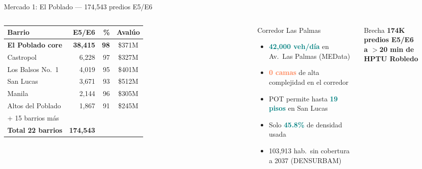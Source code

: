 \documentclass[aspectratio=169, 11pt]{beamer}
\newcommand{\highlight}[1]{\textcolor{teal}{\textbf{#1}}}
\newcommand{\danger}[1]{\textcolor{coral}{\textbf{#1}}}
\newcommand{\src}[1]{\par\vspace{2pt}{\tiny\textcolor{slate}{Fuente: #1}}}
\begin{document}
\begin{frame}{Mercado 1: El Poblado --- 174,543 predios E5/E6}

\begin{columns}[T]
{\scriptsize\setlength{\tabcolsep}{3pt}
\begin{tabular}{@{}lrrc@{}}
\toprule
\textbf{Barrio} & \textbf{E5/E6} & \textbf{\%} & \textbf{Avalúo} \\
\midrule
\rowcolor{teal!8}
\textbf{El Poblado core} & \textbf{38,415} & \textbf{98} & \$371M \\
Castropol & 6,228 & 97 & \$327M \\
Los Balsos No.\ 1 & 4,019 & 95 & \$401M \\
San Lucas & 3,671 & 93 & \$512M \\
Manila & 2,144 & 96 & \$305M \\
\rowcolor{teal!6}
Altos del Poblado & 1,867 & 91 & \$245M \\
{\tiny + 15 barrios más} & & & \\
\midrule
\textbf{Total 22 barrios} & \textbf{174,543} & & \\
\bottomrule
\end{tabular}
}

\vspace{4pt}
\src{Catastro Medellín (bp59-rj8r)}

\begin{exampleblock}{\small Corredor Las Palmas}
\footnotesize
\begin{itemize}\setlength{\itemsep}{2pt}
  \item \highlight{42,000 veh/día} en Av.\ Las Palmas (MEData)
  \item \danger{0 camas} de alta complejidad en el corredor
  \item POT permite hasta \highlight{19 pisos} en San Lucas
  \item Solo \highlight{45.8\%} de densidad usada
  \item 103,913 hab.\ sin cobertura a 2037 (DENSURBAM)
\end{itemize}
\end{exampleblock}

\vspace{4pt}
\begin{alertblock}{\small Brecha}
\centering\footnotesize
\textbf{174K predios E5/E6\\a $>$20 min de HPTU Robledo}
\end{alertblock}
\end{columns}
\end{frame}
\end{document}
